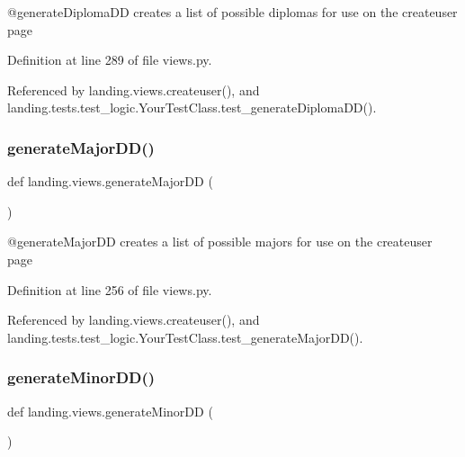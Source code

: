 \begin{DoxyVerb}@generateDiplomaDD creates a list of possible diplomas for use on the createuser page
\end{DoxyVerb}
 

Definition at line 289 of file views.\+py.



Referenced by landing.\+views.\+createuser(), and landing.\+tests.\+test\+\_\+logic.\+Your\+Test\+Class.\+test\+\_\+generate\+Diploma\+D\+D().

\mbox{\label{namespacelanding_1_1views_acee7a550e05650013c2b9205bf9a2a88}} 
\subsubsection{\texorpdfstring{generate\+Major\+D\+D()}{generateMajorDD()}}
{\footnotesize\ttfamily def landing.\+views.\+generate\+Major\+DD (\begin{DoxyParamCaption}{ }\end{DoxyParamCaption})}

\begin{DoxyVerb}@generateMajorDD creates a list of possible majors for use on the createuser page
\end{DoxyVerb}
 

Definition at line 256 of file views.\+py.



Referenced by landing.\+views.\+createuser(), and landing.\+tests.\+test\+\_\+logic.\+Your\+Test\+Class.\+test\+\_\+generate\+Major\+D\+D().

\mbox{\label{namespacelanding_1_1views_ab124c7ee183d054b2316ae213be19b21}} 
\subsubsection{\texorpdfstring{generate\+Minor\+D\+D()}{generateMinorDD()}}
{\footnotesize\ttfamily def landing.\+views.\+generate\+Minor\+DD (\begin{DoxyParamCaption}{ }\end{DoxyParamCaption})}

